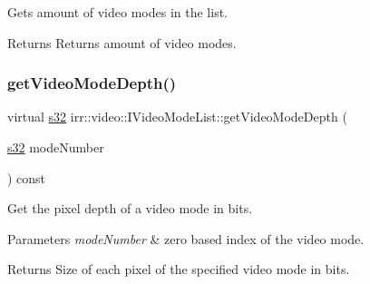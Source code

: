 Gets amount of video modes in the list. 

\begin{DoxyReturn}{Returns}
Returns amount of video modes. 
\end{DoxyReturn}
\mbox{\label{classirr_1_1video_1_1IVideoModeList_ae3f4b101eacbebe78d6a2e1a3f2e713d}} 
\subsubsection{\texorpdfstring{get\+Video\+Mode\+Depth()}{getVideoModeDepth()}\hspace{0.1cm}{\footnotesize\ttfamily [1/2]}}
{\footnotesize\ttfamily virtual \hyperlink{namespaceirr_ac66849b7a6ed16e30ebede579f9b47c6}{s32} irr\+::video\+::\+I\+Video\+Mode\+List\+::get\+Video\+Mode\+Depth (\begin{DoxyParamCaption}\item[{\hyperlink{namespaceirr_ac66849b7a6ed16e30ebede579f9b47c6}{s32}}]{mode\+Number }\end{DoxyParamCaption}) const\hspace{0.3cm}{\ttfamily [pure virtual]}}



Get the pixel depth of a video mode in bits. 


\begin{DoxyParams}{Parameters}
{\em mode\+Number} & zero based index of the video mode. \\
\hline
\end{DoxyParams}
\begin{DoxyReturn}{Returns}
Size of each pixel of the specified video mode in bits. 
\end{DoxyReturn}
\mbox{\label{classirr_1_1video_1_1IVideoModeList_ae3f4b101eacbebe78d6a2e1a3f2e713d}} 
